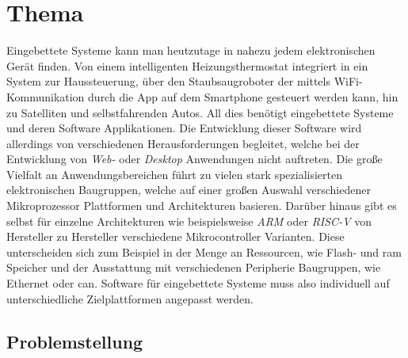 
\chapter{Thema}

Eingebettete Systeme kann man heutzutage in nahezu jedem elektronischen Gerät
finden.
Von einem intelligenten Heizungsthermostat integriert in ein System zur
Haussteuerung, über den Staubsaugroboter der mittels WiFi-Kommunikation durch
die App auf dem Smartphone gesteuert werden kann, hin zu Satelliten und
selbstfahrenden Autos.
All dies benötigt eingebettete Systeme und deren Software Applikationen.
Die Entwicklung dieser Software wird allerdings von verschiedenen
Herausforderungen begleitet, welche bei der Entwicklung von \textit{Web-}
oder \textit{Desktop} Anwendungen nicht auftreten.\newline
Die große Vielfalt an Anwendungsbereichen führt zu vielen stark
spezialisierten elektronischen Baugruppen, welche auf einer großen Auswahl
verschiedener Mikroprozessor Plattformen und Architekturen basieren.\newline
Darüber hinaus gibt es selbst für einzelne Architekturen wie beispielsweise
\textit{ARM} oder \textit{RISC-V} von Hersteller zu Hersteller verschiedene
Mikrocontroller Varianten.
Diese unterscheiden sich zum Beispiel in der Menge an Ressourcen, wie Flash-
und \acs{ram} Speicher und der Ausstattung mit verschiedenen
Peripherie Baugruppen, wie Ethernet oder \acs{can}.\newline
Software für eingebettete Systeme muss also individuell auf unterschiedliche
Zielplattformen angepasst werden.

\section{Problemstellung}

